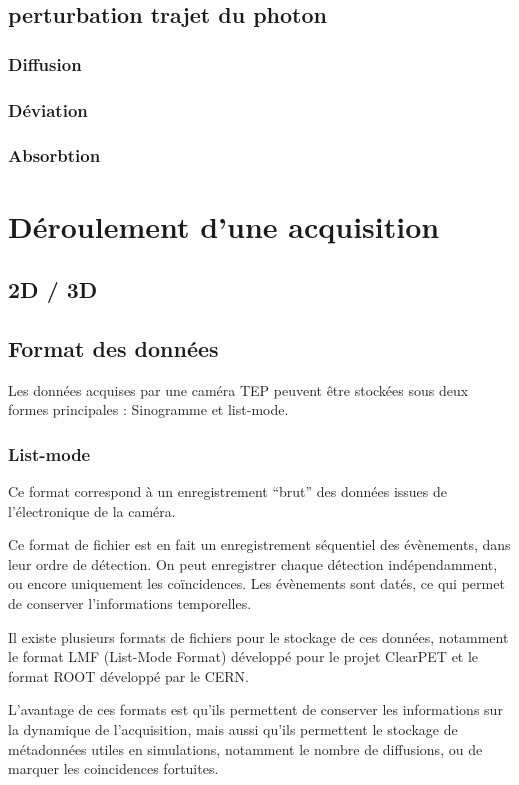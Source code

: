 	\section{perturbation trajet du photon}

		\subsection{Diffusion}
		
		\subsection{Déviation}
		
		\subsection{Absorbtion}

\chapter{Déroulement d'une acquisition}
	\section{2D / 3D}
	\section{Format des données}
Les données acquises par une caméra TEP peuvent être stockées sous deux formes principales : Sinogramme et list-mode.
		\subsection{List-mode}

Ce format correspond à un enregistrement ``brut'' des données issues de l'électronique de la caméra.

Ce format de fichier est en fait un enregistrement séquentiel des évènements, dans leur ordre de détection. On peut enregistrer chaque détection indépendamment, ou encore uniquement les coïncidences. Les évènements sont datés, ce qui permet de conserver l'informations temporelles. 

Il existe plusieurs formats de fichiers pour le stockage de ces données, notamment le format LMF (List-Mode Format) développé pour le projet ClearPET et le format ROOT développé par le CERN. 

L'avantage de ces formats est qu'ils permettent de conserver les informations sur la dynamique de l'acquisition, mais aussi qu'ils permettent le stockage de métadonnées utiles en simulations, notamment le nombre de diffusions, ou de marquer les coincidences fortuites.

